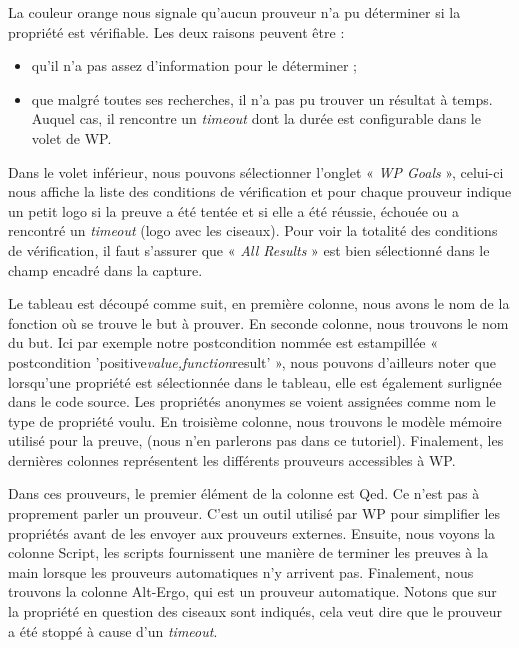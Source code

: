 La couleur orange nous signale qu'aucun prouveur n'a pu déterminer si la
propriété est vérifiable. Les deux raisons peuvent être :
\begin{itemize}
\item qu'il n'a pas assez d'information pour le déterminer ;
\item que malgré toutes ses recherches, il n'a pas pu trouver un résultat à
temps. Auquel cas, il rencontre un \textit{timeout} dont la durée est configurable
dans le volet de WP.
\end{itemize}


Dans le volet inférieur, nous pouvons sélectionner l'onglet « \textit{WP Goals} »,
celui-ci nous affiche la liste des conditions de vérification et pour chaque
prouveur indique un petit logo si la preuve a été tentée et si elle a été
réussie, échouée ou a rencontré un \textit{timeout} (logo avec les ciseaux).
Pour voir la totalité des conditions de vérification, il
faut s'assurer que « \textit{All Results} » est bien sélectionné dans le champ encadré
dans la capture.





Le tableau est découpé comme suit, en première colonne, nous avons le nom de la
fonction où se trouve le but à prouver. En seconde colonne, nous trouvons le nom
du but. Ici par exemple notre postcondition nommée est estampillée
« postcondition 'positive\textit{value,function}result' », nous pouvons d'ailleurs noter
que lorsqu'une propriété est sélectionnée dans le tableau, elle est également
surlignée dans le code source. Les propriétés anonymes se voient assignées
comme nom le type de propriété voulu. En troisième colonne, nous trouvons le
modèle mémoire utilisé pour la preuve, (nous n'en parlerons pas dans ce
tutoriel). Finalement, les dernières colonnes représentent les différents
prouveurs accessibles à WP.



Dans ces prouveurs, le premier élément de la colonne est Qed. Ce n'est pas
à proprement parler un prouveur. C'est un outil utilisé par WP pour simplifier
les propriétés avant de les envoyer aux prouveurs externes. Ensuite, nous
voyons la colonne Script, les scripts fournissent une manière de terminer
les preuves à la main lorsque les prouveurs automatiques n'y arrivent pas.
Finalement, nous trouvons la colonne Alt-Ergo, qui est un prouveur automatique.
Notons que sur la propriété en question des ciseaux sont indiqués, cela
veut dire que le prouveur a été stoppé à cause d'un \textit{timeout}.


